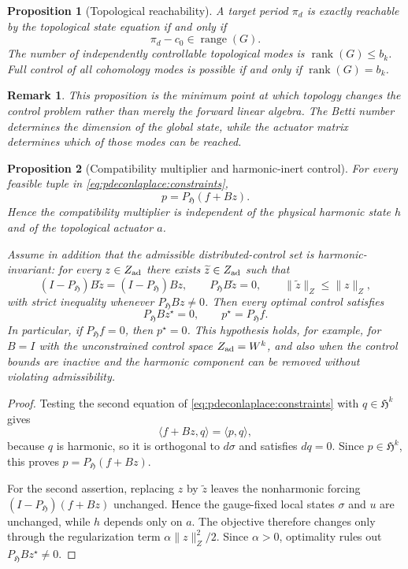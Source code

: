 \documentclass{article}
\newtheorem{proposition}{Proposition}[section]
\newtheorem{remark}{Remark}[section]
\DeclareMathOperator{\range}{range}
\newcommand{\HH}{\mathfrak H}
\newcommand{\ip}[2]{\langle #1,#2\rangle}
\newcommand{\norm}[1]{\lVert #1\rVert}
\begin{document}
\begin{proposition}[Topological reachability]\label{prop:reachability}
A target period $\pi_d$ is exactly reachable by the topological state equation if and only if
\[
 \pi_d-c_0\in\range(G).
\]
The number of independently controllable topological modes is $\operatorname{rank}(G)\le b_k$. Full control of all cohomology modes is possible if and only if $\operatorname{rank}(G)=b_k$.
\end{proposition}

\begin{remark}
This proposition is the minimum point at which topology changes the control problem rather than merely the forward linear algebra. The Betti number determines the dimension of the global state, while the actuator matrix determines which of those modes can be reached.
\end{remark}

\begin{proposition}[Compatibility multiplier and harmonic-inert control]
\label{prop:p-inert}
For every feasible tuple in \eqref{eq:pdeconlaplace:constraints},
\[
 p=P_{\HH}(f+Bz).
\]
Hence the compatibility multiplier is independent of the physical harmonic state
$h$ and of the topological actuator $a$.

Assume in addition that the admissible distributed-control set is
\emph{harmonic-invariant}: for every $z\in Z_{\rm ad}$ there exists
$\widetilde z\in Z_{\rm ad}$ such that
\[
 (I-P_{\HH})B\widetilde z=(I-P_{\HH})Bz,\qquad
 P_{\HH}B\widetilde z=0,\qquad
 \norm{\widetilde z}_{Z}\le \norm{z}_{Z},
\]
with strict inequality whenever $P_{\HH}Bz\neq0$. Then every optimal control
satisfies
\[
 P_{\HH}Bz^{\star}=0,\qquad p^{\star}=P_{\HH}f.
\]
In particular, if $P_{\HH}f=0$, then $p^{\star}=0$. This hypothesis holds, for
example, for $B=I$ with the unconstrained control space
$Z_{\rm ad}=W^{k}$, and also when the control bounds are inactive and the
harmonic component can be removed without violating admissibility.
\end{proposition}

\begin{proof}
Testing the second equation of \eqref{eq:pdeconlaplace:constraints} with
$q\in\HH^{k}$ gives
\[
 \ip{f+Bz}{q}=\ip{p}{q},
\]
because $q$ is harmonic, so it is orthogonal to $d\sigma$ and satisfies
$dq=0$. Since $p\in\HH^{k}$, this proves
$p=P_{\HH}(f+Bz)$.

For the second assertion, replacing $z$ by $\widetilde z$ leaves the
nonharmonic forcing $(I-P_{\HH})(f+Bz)$ unchanged. Hence the gauge-fixed local
states $\sigma$ and $u$ are unchanged, while $h$ depends only on $a$. The
objective therefore changes only through the regularization term
$\alpha\norm{z}_{Z}^{2}/2$. Since $\alpha>0$, optimality rules out
$P_{\HH}Bz^{\star}\neq0$.
\end{proof}
\end{document}
